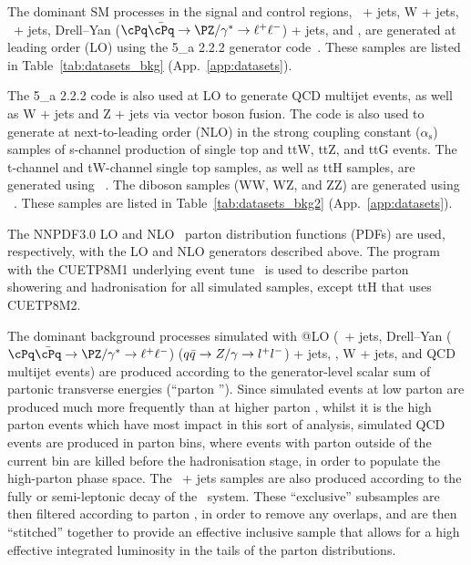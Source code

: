 The dominant SM processes in the signal and control regions, \znunu\ +
jets, W + jets, \ttbar\ + jets, Drell--Yan ($\cPq\bar{\cPq} \to
\PZ/\gamma^* \to \ell^+\ell^-$) + jets, and \gj, are generated at
leading order (LO) using the {\MADGRAPH{}5\_a\MCATNLO} 2.2.2 generator
code~\cite{madgraph}. These samples are listed in
Table~\ref{tab:datasets_bkg} (App.~\ref{app:datasets}).

The {\MADGRAPH{}5\_a\MCATNLO} 2.2.2 code is also used at LO to
generate QCD multijet events, as well as W + jets and Z + jets via
vector boson fusion. The \MADGRAPH{} code is also used to generate at
next-to-leading order (NLO) in the strong coupling constant
($\alpha_\textrm{s}$) samples of s-channel production of single top
and ttW, ttZ, and ttG events. The t-channel and tW-channel single top
samples, as well as ttH samples, are generated using
\POWHEG~\cite{nlotop}. The diboson samples (WW, WZ, and ZZ) are generated
using \PYTHIA~\cite{pythia}. These samples are listed in
Table~\ref{tab:datasets_bkg2} (App.~\ref{app:datasets}).

The {NNPDF}3.0 LO and NLO~\cite{nnpdf} parton distribution functions
(PDFs) are used, respectively, with the LO and NLO generators
described above. The \PYTHIA program with the CUETP8M1 underlying
event tune~\cite{Khachatryan:2015pea} is used to describe parton
showering and hadronisation for all simulated samples, except ttH that
uses CUETP8M2.

The dominant background processes simulated with \MADGRAPH{}@LO
(\znunu\ + jets, Drell--Yan ($\cPq\bar{\cPq} \to \PZ/\gamma^* \to
\ell^+\ell^-$) ($q\bar{q} \rightarrow Z/\gamma \rightarrow l^+l^-$) + jets, \gj, W +
jets, and QCD multijet events) are produced according to the
generator-level scalar sum of partonic transverse energies (``parton
\scalht''). 
Since simulated events at low parton \scalht are
produced much more  frequently than at higher  parton \scalht, whilst it  is the high
parton \scalht  events which have  most impact in this  sort of analysis,
simulated QCD events are produced in parton \scalht bins, where events with parton \scalht outside
of the  current bin are killed  before the hadronisation stage,  in order to
populate the high-parton \scalht phase space.
The \ttbar\ + jets samples are also produced according to
the fully or semi-leptonic decay of the \ttbar\ system. These ``exclusive''
subsamples are then filtered according to parton \scalht, in order to
remove any overlaps, and are then ``stitched'' together to provide an
effective inclusive sample that allows for a high effective
integrated luminosity in the tails of the parton \scalht
distributions.

